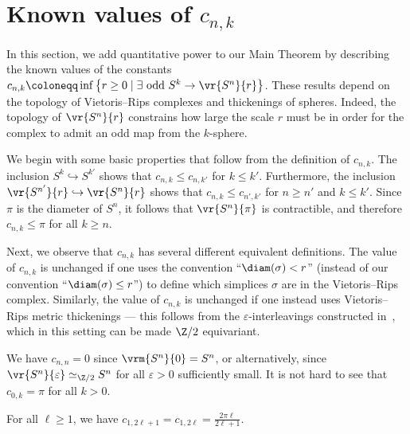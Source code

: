 \documentclass[11pt, reqno, english]{amsart}
\begin{document}



\section{Known values of $c_{n,k}$}
\label{sec:known-values-cnk}

In this section, we add quantitative power to our Main Theorem by describing the known values of the constants $c_{n,k} \coloneqq \inf \left\{r\ge 0 \mid \exists \text{ odd }S^k \to \vr{S^n}{r}\right\}$.
These results depend on the topology of Vietoris--Rips complexes and thickenings of spheres.
Indeed, the topology of $\vr{S^n}{r}$ constrains how large the scale $r$ must be in order for the complex to admit an odd map from the $k$-sphere.

We begin with some basic properties that follow from the definition of $c_{n,k}$.
The inclusion $S^k \hookrightarrow S^{k'}$ shows that $c_{n,k}\le c_{n,k'}$ for $k\le k'$.
Furthermore, the inclusion $\vr{S^{n'}}{r} \hookrightarrow \vr{S^n}{r}$ shows that $c_{n,k}\le c_{n',k'}$ for $n\ge n'$ and $k\le k'$.
Since $\pi$ is the diameter of $S^n$, it follows that $\vr{S^n}{\pi}$ is contractible, and therefore $c_{n,k}\le \pi$ for all $k\ge n$.

Next, we observe that $c_{n,k}$ has several different equivalent definitions.
The value of $c_{n,k}$ is unchanged if one uses the convention ``$\diam(\sigma)< r$'' (instead of our convention ``$\diam(\sigma)\le r$'') to define which simplices $\sigma$ are in the Vietoris--Rips complex.
Similarly, the value of $c_{n,k}$ is unchanged if one instead uses Vietoris--Rips metric thickenings --- this follows from the $\varepsilon$-interleavings constructed in~\cite{AMMW,MoyMasters}, which in this setting can be made $\Z/2$ equivariant.

We have $c_{n,n}=0$ since $\vrm{S^n}{0}=S^n$, or alternatively, since $\vr{S^n}{\varepsilon}\simeq_{\Z/2} S^n$ for all $\varepsilon>0$ sufficiently small.
It is not hard to see that $c_{0,k}=\pi$ for all $k > 0$.%

\begin{theorem}
\label{thm:c-1-k}
For all $\ell\ge 1$, we have $c_{1,2\ell+1}=c_{1,2\ell}=\tfrac{2\pi \ell}{2\ell+1}$.
\end{theorem}
\end{document}
